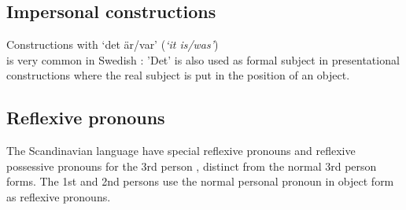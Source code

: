 \documentclass{report}
\begin{document}
\subsection*{Impersonal constructions}
Constructions with `det är/var' (\emph{`it is/was'}) \\is very common in Swedish
\cite[\textsection 309d]{H&H}:
'Det' %
is also used as formal subject in presentational constructions where
the real subject is put in the position of an object.

\subsection*{Reflexive pronouns}
\label{swe:refl}
The Scandinavian language have special reflexive pronouns
and reflexive possessive pronouns for the 3rd
person \cite[ \& 319]{H&H}, distinct from the normal 3rd person forms.
The 1st and 2nd persons use the normal personal pronoun in object form as reflexive
pronouns.

\end{document}
